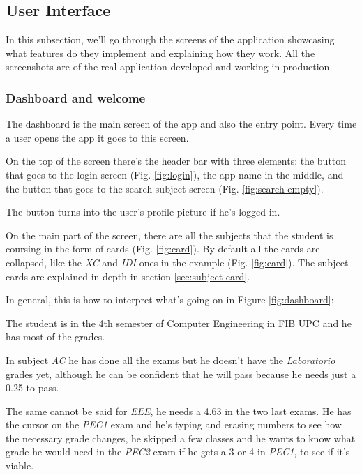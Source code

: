 \subsection{User Interface}
\label{sec:ui}

In this subsection, we'll go through the screens of the application showcasing what features do they implement and explaining how they work. All the screenshots are of the real application developed and working in production. 

\subsubsection{Dashboard and welcome}

The dashboard is the main screen of the app and also the entry point. Every time a user opens the app it goes to this screen.

On the top of the screen there's the header bar with three elements: the  button that goes to the login screen (Fig. \ref{fig:login}), the app name in the middle, and the  button that goes to the search subject screen (Fig. \ref{fig:search-empty}).

The  button turns into the user's profile picture if he's logged in.

On the main part of the screen, there are all the subjects that the student is coursing in the form of cards (Fig. \ref{fig:card}). By default all the cards are collapsed, like the \textit{XC} and \textit{IDI} ones in the example (Fig. \ref{fig:card}). The subject cards are explained in depth in section \ref{sec:subject-card}.

\clearpage\newpage
\noindent
In general, this is how to interpret what's going on in Figure \ref{fig:dashboard}:

The student is in the 4th semester of Computer Engineering in FIB UPC and he has most of the grades. 

In subject \textit{AC} he has done all the exams but he doesn't have the \textit{Laboratorio} grades yet, although he can be confident that he will pass because he needs just a 0.25 to pass. 

The same cannot be said for \textit{EEE}, he needs a 4.63 in the two last exams. He has the cursor on the \textit{PEC1} exam and he's typing and erasing numbers to see how the necessary grade changes, he skipped a few classes and he wants to know what grade he would need in the \textit{PEC2} exam if he gets a 3 or 4 in \textit{PEC1}, to see if it's viable.

